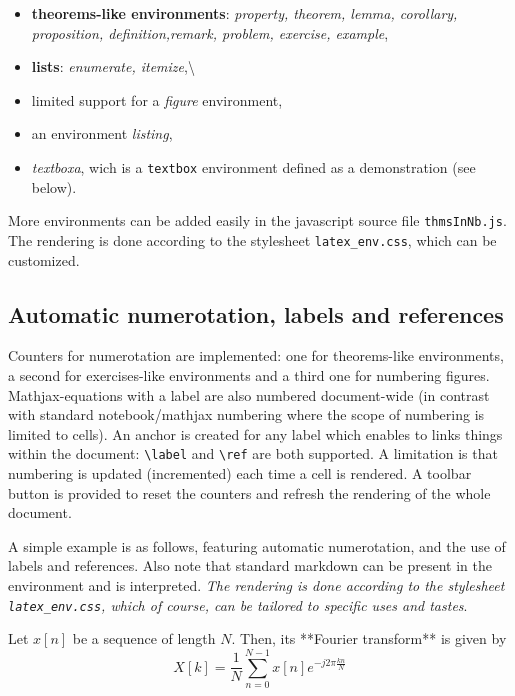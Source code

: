     \begin{itemize}
\itemsep1pt\parskip0pt \item
\textbf{theorems-like environments}: \emph{property, theorem, lemma,
  corollary, proposition, definition,remark, problem, exercise,
  example}, \item \textbf{lists}:
\emph{enumerate, itemize},\textbackslash{} \item limited support for a
\emph{figure} environment, \item an environment \emph{listing}, \item
\emph{textboxa}, wich is a \texttt{textbox} environment defined as a
demonstration (see below).
\end{itemize}

More environments can be added easily in the javascript source file
\texttt{thmsInNb.js}. The rendering is done according to the stylesheet
\texttt{latex\_env.css}, which can be customized.

    \subsection{Automatic numerotation, labels and
references}\label{automatic-numerotation-labels-and-references}

    Counters for numerotation are implemented: one for theorems-like
environments, a second for exercises-like environments and a third one
for numbering figures.\\Mathjax-equations with a label are also numbered
document-wide (in contrast with standard notebook/mathjax numbering
where the scope of numbering is limited to cells). An anchor is created
for any label which enables to links things within the document:
\texttt{\textbackslash{}label} and \texttt{\textbackslash{}ref} are both
supported. A limitation is that numbering is updated (incremented) each
time a cell is rendered. A toolbar button is provided to reset the
counters and refresh the rendering of the whole document.

    A simple example is as follows, featuring automatic numerotation, and
the use of labels and references. Also note that standard markdown can
be present in the environment and is interpreted. \emph{The rendering is
done according to the stylesheet \texttt{latex\_env.css}, which of
course, can be tailored to specific uses and tastes}.

\begin{listing}
\begin{definition} \label{def:FT}
Let $x[n]$ be a sequence of length $N$. Then, its **Fourier transform** is given by
\begin{equation}
\label{eq:FT}
X[k]= \frac{1}{N} \sum_{n=0}^{N-1} x[n] e^{-j2\pi \frac{kn}{N}}
\end{equation}
\end{definition}
\end{listing}

